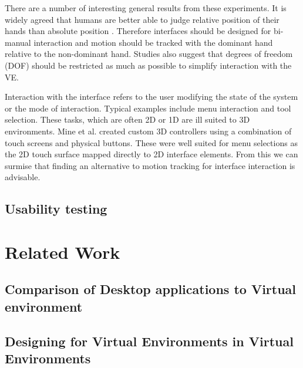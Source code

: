 \documentclass{sig-alternate-05-2015}
\begin{document}
 There are a number of interesting general results from these experiments. It is widely agreed that humans are better able to judge relative position of their hands than absolute position \cite{Bowman1998, Buxton1986}. Therefore interfaces should be designed for bi-manual interaction and motion should be tracked with the dominant hand relative to the non-dominant hand. Studies also suggest that degrees of freedom (DOF) should be restricted as much as possible to simplify interaction with the VE.
 
 Interaction with the interface refers to the user modifying the state of the system or the mode of interaction\cite{Bowman2001}. Typical examples include menu interaction and tool selection. These tasks, which are often 2D or 1D are ill suited to 3D environments\cite{Bowman2001}. Mine et al. created custom 3D controllers using a combination of touch screens and physical buttons. \cite{Mine2014} These were well suited for menu selections as the 2D touch surface mapped directly to 2D interface elements. From this we can surmise that finding an alternative to motion tracking for interface interaction is advisable.
\subsection{Usability testing}
\section{Related Work}
\subsection{Comparison of Desktop applications to Virtual environment}
\subsection{Designing for Virtual Environments in Virtual Environments}



\end{document}

